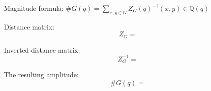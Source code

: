 \documentclass[12pt]{extarticle}
\begin{document}
Magnitude formula: $\#G(q) = \sum_{x,y \in G} Z_G(q)^{-1}(x,y) \in \mathbb {Q}(q)$

\bigskip
Distance matrix: $$Z_G = $$

\bigskip

Inverted distance matrix: $$ Z_G^{-1} =  $$

\bigskip

The resulting amplitude: $$\#G(q) = $$
\end{document}
